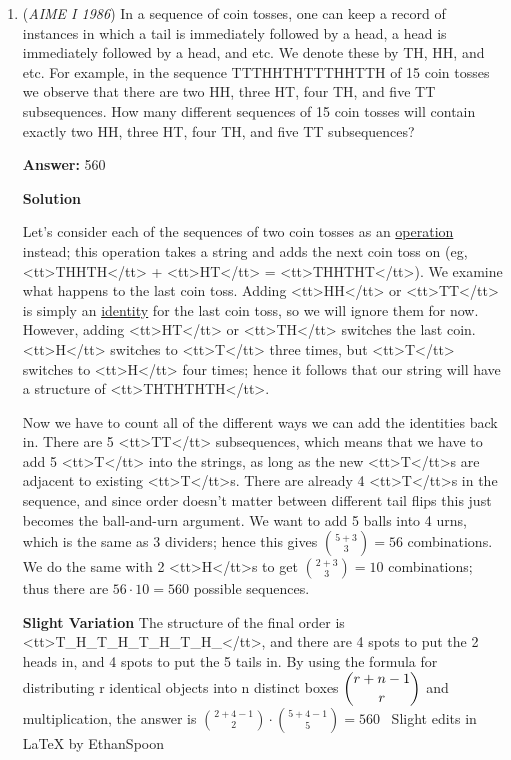 \begin{enumerate}
	\item (\textit{AIME I 1986}) In a sequence of coin tosses, one can keep a record of instances in which a tail is immediately followed by a head, a head is immediately followed by a head, and etc. We denote these by TH, HH, and etc. For example, in the sequence TTTHHTHTTTHHTTH of 15 coin tosses we observe that there are two HH, three HT, four TH, and five TT subsequences. How many different sequences of 15 coin tosses will contain exactly two HH, three HT, four TH, and five TT subsequences?


 
 \textbf{Answer: }560



\textbf{Solution}

Let's consider each of the sequences of two coin tosses as an \href{https://artofproblemsolving.com/wiki/index.php?title=Operation}{operation} instead; this operation takes a string and adds the next coin toss on (eg, <tt>THHTH</tt> + <tt>HT</tt> = <tt>THHTHT</tt>). We examine what happens to the last coin toss. Adding <tt>HH</tt> or <tt>TT</tt> is simply an \href{https://artofproblemsolving.com/wiki/index.php?title=Identity}{identity} for the last coin toss, so we will ignore them for now. However, adding <tt>HT</tt> or <tt>TH</tt> switches the last coin. <tt>H</tt> switches to <tt>T</tt> three times, but <tt>T</tt> switches to <tt>H</tt> four times; hence it follows that our string will have a structure of <tt>THTHTHTH</tt>. 

 Now we have to count all of the different ways we can add the identities back in. There are 5 <tt>TT</tt> subsequences, which means that we have to add 5 <tt>T</tt> into the strings, as long as the new <tt>T</tt>s are adjacent to existing <tt>T</tt>s. There are already 4 <tt>T</tt>s in the sequence, and since order doesn’t matter between different tail flips this just becomes the ball-and-urn argument. We want to add 5 balls into 4 urns, which is the same as 3 dividers; hence this gives ${{5+3}\choose3} = 56$ combinations. We do the same with 2 <tt>H</tt>s to get ${{2+3}\choose3} = 10$ combinations; thus there are $56 \cdot 10 = \boxed {560}$ possible sequences.

 \textbf{Slight Variation} The structure of the final order is <tt>T\_H\_T\_H\_T\_H\_T\_H\_</tt>, and there are 4 spots to put the 2 heads in, and 4 spots to put the 5 tails in.  By using the formula for distributing r identical objects into n distinct boxes $\dbinom{r+n-1}{r}$ and multiplication, the answer is  ${{2+4-1}\choose2} \cdot{{5+4-1}\choose5}=560$ ~Slight edits in LaTeX by EthanSpoon


\end{enumerate}
